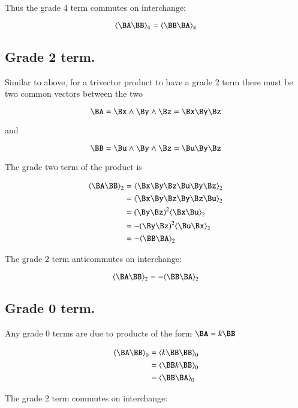 Thus the grade 4 term commutes on interchange:

\begin{equation}\label{eqn:trivector:trivecgpgrade4}
\gpgrade{\BA\BB}{4} = \gpgrade{\BB\BA}{4}
\end{equation}

\subsection{Grade 2 term. }

Similar to above, 
for a trivector product to have a grade 2 term there must be two common
vectors between the two

\[
\BA = \Bx \wedge \By \wedge \Bz = \Bx\By\Bz
\]

and

\[
\BB = \Bu \wedge \By \wedge \Bz =\Bu\By\Bz
\]

The grade two term of the product is

\begin{align*}
\gpgrade{\BA \BB}{2}
&= \gpgrade{ \Bx\By\Bz \Bu\By\Bz }{2} \\
&= \gpgrade{ \Bx\By\Bz \By\Bz \Bu}{2} \\
&= (\By\Bz)^2\gpgrade{ \Bx \Bu}{2} \\
&= -(\By\Bz)^2\gpgrade{ \Bu \Bx}{2} \\
&= -\gpgrade{ \BB \BA }{2} \\
\end{align*}

The grade 2 term anticommutes on interchange:

\begin{equation}\label{eqn:trivector:trivecgpgrade2}
\gpgrade{\BA\BB}{2} = -\gpgrade{\BB\BA}{2}
\end{equation}

\subsection{Grade 0 term. }

Any grade 0 terms are due to products of the form $\BA = k\BB$

\begin{align*}
\gpgrade{\BA \BB}{0}
&= \gpgrade{k\BB \BB}{0} \\
&= \gpgrade{\BB k\BB}{0} \\
&= \gpgrade{\BB \BA}{0} \\
\end{align*}

The grade 2 term commutes on interchange:

